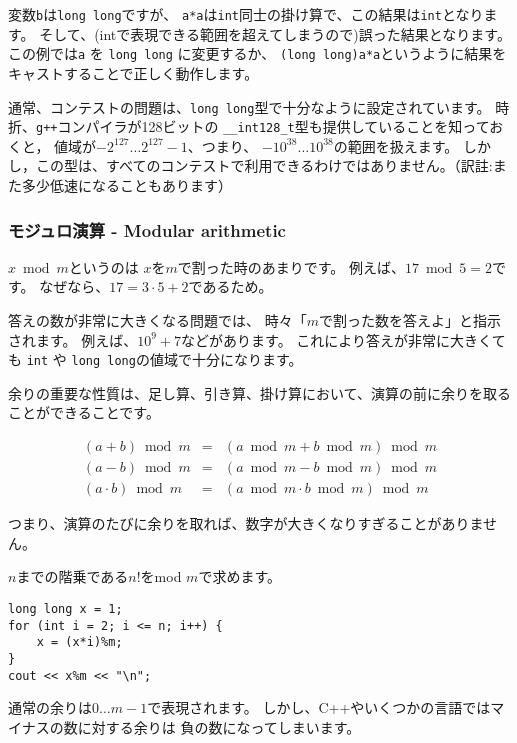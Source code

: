 変数\texttt{b}は\texttt{long long}ですが、
\texttt{a*a}は\texttt{int}同士の掛け算で、この結果は\texttt{int}となります。
そして、(intで表現できる範囲を超えてしまうので)誤った結果となります。
この例では\texttt{a} を \texttt{long long} に変更するか、
\texttt{(long long)a*a}というように結果をキャストすることで正しく動作します。

通常、コンテストの問題は、\texttt{long long}型で十分なように設定されています。
時折、\texttt{g++}コンパイラが128ビットの \texttt{\_\_int128\_t}型も提供していることを知っておくと，
値域が$-2^{127} \ldots 2^{127}-1$、つまり、 $-10^{38} \ldots 10^{38}$の範囲を扱えます。
しかし，この型は、すべてのコンテストで利用できるわけではありません。（訳註:また多少低速になることもあります）

\subsubsection{モジュロ演算 - Modular arithmetic}


$x \bmod m$というのは
 $x$を$m$で割った時のあまりです。
例えば、$17 \bmod 5 = 2$です。
なぜなら、$17 = 3 \cdot 5 + 2$であるため。

答えの数が非常に大きくなる問題では、
時々「$m$で割った数を答えよ」と指示されます。
例えば、$10^9+7$などがあります。
これにより答えが非常に大きくても
\texttt{int} や \texttt{long long}の値域で十分になります。

余りの重要な性質は、足し算、引き算、掛け算において、演算の前に余りを取ることができることです。

\[
\begin{array}{rcr}
(a+b) \bmod m & = & (a \bmod m + b \bmod m) \bmod m \\
(a-b) \bmod m & = & (a \bmod m - b \bmod m) \bmod m \\
(a \cdot b) \bmod m & = & (a \bmod m \cdot b \bmod m) \bmod m
\end{array}
\]

つまり、演算のたびに余りを取れば、数字が大きくなりすぎることがありません。

$n$までの階乗である$n!$をmod $m$で求めます。
\begin{lstlisting}
long long x = 1;
for (int i = 2; i <= n; i++) {
    x = (x*i)%m;
}
cout << x%m << "\n";
\end{lstlisting}

通常の余りは$0\ldots m-1$で表現されます。
しかし、C++やいくつかの言語ではマイナスの数に対する余りは
負の数になってしまいます。


